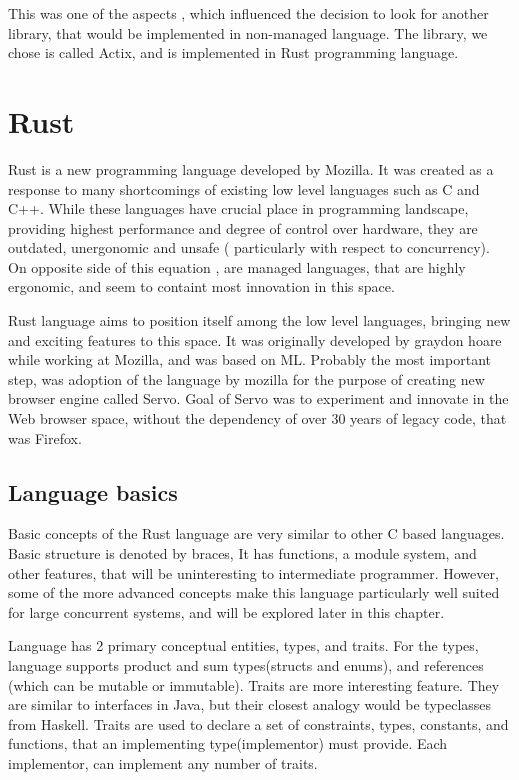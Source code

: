 This was one of the aspects , which influenced the decision to look for another library, that would be implemented in
non-managed language. The library, we chose is called Actix\cite{web:actix}, and is implemented in Rust\cite{Blandy:2015:RPL:3019371}
programming language.

\section{Rust}
Rust is a new programming language developed by Mozilla. It was created as a response to many shortcomings of existing low level
languages such as C and C++. While these languages have crucial place in programming landscape, providing highest performance and
degree of control over hardware, they are outdated, unergonomic and unsafe ( particularly with respect to concurrency). On opposite
side of this equation , are managed languages, that are highly ergonomic, and seem to containt most innovation in this space.

Rust language aims to position itself among the low level languages, bringing new and exciting features to this space.
It was originally developed by graydon hoare\cite{web:rust_progress} while working at Mozilla, and was based on
ML. Probably the most important step, was adoption of the language by mozilla for the purpose of creating new browser engine
called Servo\cite{proc:servo}. Goal of Servo was to experiment and innovate in the Web browser space, without
the dependency of over 30 years of legacy code, that was Firefox.

\subsection{Language basics}
Basic concepts of the Rust language are very similar to other C based languages. Basic structure is denoted by braces,
It has functions, a module system, and other features, that will be uninteresting to intermediate programmer.
However, some of the more advanced concepts make this language particularly well suited for large concurrent systems, and
will be explored later in this chapter.

Language has 2 primary conceptual entities, types, and traits.
For the types, language supports product and sum types(structs and enums), and references (which can be mutable or immutable).
Traits are more interesting feature. They are similar to interfaces in Java, but their closest analogy would be typeclasses from Haskell.
Traits are used to declare a set of constraints, types, constants, and functions, that an implementing type(implementor) must provide.
Each implementor, can implement any number of traits.

